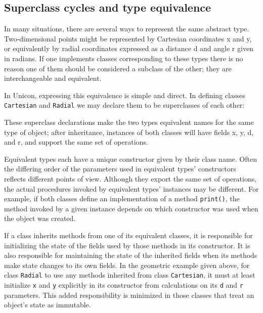 \subsection*{Superclass cycles and type equivalence}

In many situations, there are several ways to represent the same
abstract type. Two-dimensional points might be represented by
Cartesian coordinates x and y, or
equivalently by radial coordinates expressed as a distance d and angle
r given in radians. If one implements classes
corresponding to these types there is no reason one of them should be
considered a subclass of the other; they are interchangeable and
equivalent.

In Unicon, expressing this equivalence is simple and direct. In defining
classes \texttt{Cartesian} and \texttt{Radial} we may declare them to
be superclasses of each other: 


These superclass declarations make the two types equivalent names for
the same type of object; after inheritance,
instances of both classes will
have fields x, y, d, and r, and support the same set of operations. 

Equivalent types each have a unique constructor
given by their class name. Often the differing order of the parameters
used in equivalent types' constructors reflects
different points of view. Although they export the same set of
operations, the actual procedures invoked by equivalent
types' instances may be different. For example, if
both classes define an implementation of a method \texttt{print()}, the
method invoked by a given instance depends on which constructor was
used when the object was created.

If a class inherits methods from one of its equivalent classes, it
is responsible for initializing the state of the fields used by
those methods in its constructor. It is also responsible for
maintaining the state of the inherited fields when its methods make
state changes to its own fields. In the geometric example given above,
for class \texttt{Radial} to use any methods inherited from class
\texttt{Cartesian}, it must at least initialize \texttt{x} and
\texttt{y} explicitly in its constructor from calculations on its
\texttt{d} and \texttt{r} parameters. This added
responsibility is minimized in those classes that treat an
object's state as immutable.

